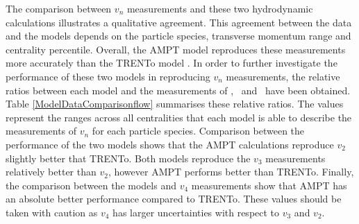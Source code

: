 The comparison between $v_{n}$ measurements and these two hydrodynamic calculations illustrates a qualitative agreement. This agreement between the data and the models depends on the particle species, transverse momentum range and centrality percentile. Overall, the AMPT model reproduces these measurements more accurately than the TRENTo model \cite{Acharya:2018zuq}. In order to further investigate the performance of these two models in reproducing $v_{n}$ measurements, the relative ratios between each model and the measurements of \pion, \kaon~and \proton~have been obtained. Table \ref{ModelDataComparisonflow} summarises these relative ratios. The values represent the ranges across all centralities that each model is able to describe the measurements of $v_n$ for each particle species. Comparison between the performance of the two models shows that the AMPT calculations reproduce $v_{2}$ slightly better that TRENTo. Both models reproduce the $v_{3}$ measurements relatively better than $v_{2}$, however AMPT performs better than TRENTo. Finally, the comparison between the models and $v_{4}$ measurements show that AMPT has an absolute better performance compared to TRENTo. These values should be taken with caution as $v_{4}$ has larger uncertainties with respect to $v_{3}$ and $v_{2}$. 

\begin{table}[!h]
\centering
{}

\caption{List of minimum and maximum value of the fit to relative ratios between the data and each model for  $v_{n} (n=2,3,4)$ of \pion, \kaon~and \proton. The minimum and maximum are obtained from 0-5\% up to 40-50\% centrality intervals .}\label{ModelDataComparisonflow}
\end{table}

